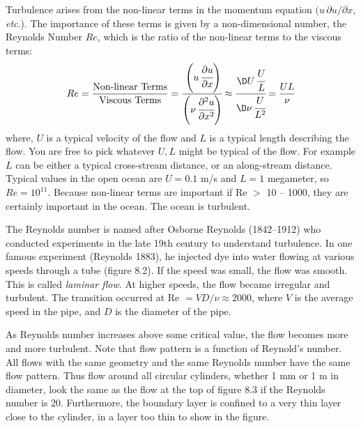 Turbulence arises from the non-linear terms in the momentum equation
$(u\,\partial{u}/\partial{x}$, \textit{etc}.). The importance of these
terms is given by a non-dimensional number, the Reynolds Number $Re$,
which is the ratio of the non-linear terms to the viscous terms:
\begin{equation}
Re = \frac{\text{Non-linear Terms}}{\text{Viscous
Terms}} =
\cfrac{\left( \displaystyle u\,\cfrac{\partial{u}}{\partial{x}}\right) }{\left( \displaystyle \nu\,\cfrac{\partial^2{u}}{\partial{x^2}}\right)
} \approx \cfrac{\D U\,\cfrac{U}{L\vphantom{y}}}{\D \nu\,\cfrac{U}{L^2}}
= \frac{UL}{\nu}
\end{equation}
where, $U$ is a typical velocity of the flow and $L$ is a typical
length describing the flow. You are free to pick whatever $U,L$ might
be typical of the flow. For example $L$ can be either a typical
cross-stream distance, or an along-stream distance. Typical values in
the open ocean are $U = 0.1$ m/s and $L = 1$ megameter, so
$Re = 10^{11}$. Because non-linear terms are important if Re $>$ 10 -- 1000,
they are certainly important in the ocean. The ocean is turbulent.

The Reynolds number is named after Osborne Reynolds (1842--1912) who
conducted experiments in the late 19th century to understand
turbulence.  In one famous experiment
(Reynolds 1883), he injected dye into water flowing at various speeds
through a tube (figure 8.2). If the speed was small, the flow was
smooth. This is called \textit{laminar flow}. At higher speeds, the
flow became irregular and turbulent. The transition occurred at Re $ =
VD/\nu \approx 2000$, where $V$ is the average speed in the pipe, and
$D$ is the diameter of the pipe.

As Reynolds number increases above some critical value, the flow
becomes more and more turbulent. Note that flow pattern is a function
of Reynold's number. All flows with the same geometry and the same
Reynolds number have the same flow pattern. Thus flow around all
circular cylinders, whether 1 mm or 1 m in diameter, look the same as
the flow at the top of figure 8.3 if the Reynolds number is
20. Furthermore, the boundary layer is confined to a very thin layer
close to the cylinder, in a layer too thin to show in the figure.

